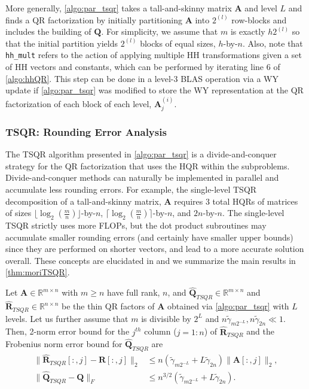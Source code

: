 \documentclass[review,onefignum,onetabnum]{siamart190516}
\newcommand{\R}{\mathbb{R}}
\newcommand{\bb}[1]{\mathbf{#1}}
\begin{document}
More generally, \cref{algo:par_tsqr} takes a tall-and-skinny matrix $\bb{A}$ and level $L$ and finds a QR factorization by initially partitioning $\bb{A}$ into $2^{(l)}$ row-blocks and includes the building of $\bb{Q}$.
For simplicity, we assume that $m$ is exactly $h2^{(l)}$ so that the initial partition yields $2^{(l)}$ blocks of equal sizes, $h$-by-$n$. 
Also, note that {\tt hh\_mult} refers to the action of applying multiple HH transformations given a set of HH vectors and constants, which can be performed by iterating line 6 of \cref{algo:hhQR}.
This step can be done in a level-3 BLAS operation via a WY update if \cref{algo:par_tsqr} was modified to store the WY representation at the QR factorization of each block of each level, $\bb{A}_j^{(i)}$. 

\subsubsection{TSQR: Rounding Error Analysis}
\label{sec:TSQRre}
The TSQR algorithm presented in \cref{algo:par_tsqr} is a divide-and-conquer strategy for the QR factorization that uses the HQR within the subproblems. 
Divide-and-conquer methods can naturally be implemented in parallel and accumulate less rounding errors.
For example, the single-level TSQR decomposition of a tall-and-skinny matrix, $\bb{A}$ requires 3 total HQRs of matrices of sizes $\lfloor\log_{2}(\frac{m}{n})\rfloor$-by-$n$, $\lceil\log_{2}(\frac{m}{n})\rceil$-by-$n$, and $2n$-by-$n$.
The single-level TSQR strictly uses more FLOPs, but the dot product subroutines may accumulate smaller rounding errors (and certainly have smaller upper bounds) since they are performed on shorter vectors, and lead to a more accurate solution overall.
These concepts are elucidated in \cite{Mori2012} and we summarize the main results  in \cref{thm:moriTSQR}.

\begin{theorem}
	\label{thm:moriTSQR}
	Let $\bb{A}\in\R^{m\times n}$ with $m\geq n$ have full rank, $n$, and $\hat{\bb{Q}}_{TSQR}\in\R^{m\times n}$ and $\hat{\bb{R}}_{TSQR}\in\R^{n\times n}$ be the thin QR factors of $\bb{A}$ obtained via \cref{algo:par_tsqr} with $L$ levels. 
	Let us further assume that $m$ is divisible by $2^L$ and $n\tilde{\gamma}_{m2^{-L}}, n\tilde{\gamma}_{ 2n} \ll 1$.
	Then, 2-norm error bound for the $j^{th}$ column ($j=1:n$) of $\hat{\bb{R}}_{TSQR}$ and the Frobenius norm error bound for $\hat{\bb{Q}}_{TSQR}$ are
	\begin{align}
	\|\hat{\bb{R}}_{TSQR}[:,j]-\bb{R}[:,j]\|_2 &\leq n(\tilde{\gamma}_{m2^{-L}} + L\tilde{\gamma}_{ 2n})\|\bb{A}[:,j]\|_2,  \label{eqn:tsqrRA}\\
	\|\hat{\bb{Q}}_{TSQR}-\bb{Q}\|_F &\leq n^{3/2}(\tilde{\gamma}_{m2^{-L}} + L\tilde{\gamma}_{ 2n}).\label{eqn:tsqrQ}
	\end{align}
\end{theorem}
\end{document}
